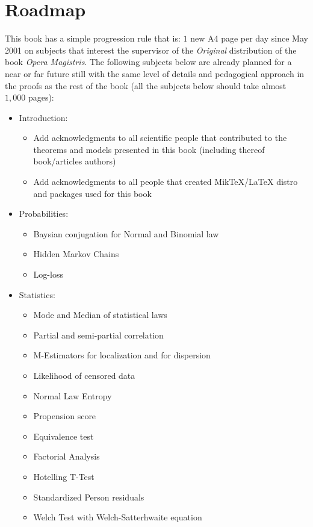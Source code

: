 	\section{Roadmap}
	This book has a simple progression rule that is: $1$ new A4 page per day since May 2001 on subjects that interest the supervisor of the \textit{Original} distribution of the book \textit{Opera Magistris}. The following subjects below are already planned for a near or far future still with the same level of details and pedagogical approach in the proofs as the rest of the book (all the subjects below should take almost $1,000$ pages):
	\begin{itemize}
		\item Introduction:
			\begin{itemize}
				\item Add acknowledgments to all scientific people that contributed to the theorems and models presented in this book (including thereof book/articles authors)
				\item Add acknowledgments to all people that created MikTeX/LaTeX distro and packages used for this book
			\end{itemize}
		\item Probabilities:
			\begin{itemize}
				\item Baysian conjugation for Normal and Binomial law
				\item Hidden Markov Chains
				\item Log-loss
			\end{itemize}
		\item Statistics: 
			\begin{itemize}
				\item Mode and Median of statistical laws				
				\item Partial and semi-partial correlation
				\item M-Estimators for localization and for dispersion
				\item Likelihood of censored data
				\item Normal Law Entropy
				\item Propension score
				\item Equivalence test
				\item Factorial Analysis
				\item Hotelling T-Test
				\item Standardized Person residuals
				\item Welch Test with Welch-Satterhwaite equation

\end{itemize}
\end{itemize}
